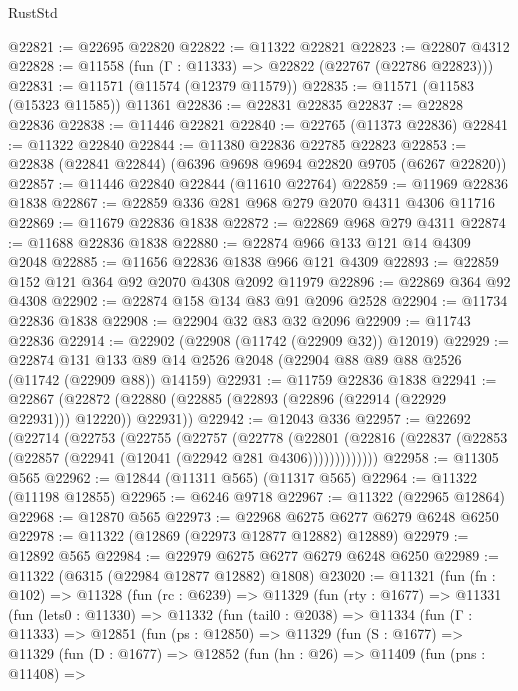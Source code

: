\begin{lexlean}{RustStd}
\begin{coremodule}
@22821 := @22695 @22820
@22822 := @11322 @22821
@22823 := @22807 @4312
@22828 := @11558 (fun (Γ : @11333) => @22822 (@22767 (@22786 @22823)))
@22831 := @11571 (@11574 (@12379 @11579))
@22835 := @11571 (@11583 (@15323 @11585)) @11361
@22836 := @22831 @22835
@22837 := @22828 @22836
@22838 := @11446 @22821
@22840 := @22765 (@11373 @22836)
@22841 := @11322 @22840
@22844 := @11380 @22836 @22785 @22823
@22853 := @22838 (@22841 @22844) (@6396 @9698 @9694 @22820 @9705 (@6267 @22820))
@22857 := @11446 @22840 @22844 (@11610 @22764)
@22859 := @11969 @22836 @1838
@22867 := @22859 @336 @281 @968 @279 @2070 @4311 @4306 @11716
@22869 := @11679 @22836 @1838
@22872 := @22869 @968 @279 @4311
@22874 := @11688 @22836 @1838
@22880 := @22874 @966 @133 @121 @14 @4309 @2048
@22885 := @11656 @22836 @1838 @966 @121 @4309
@22893 := @22859 @152 @121 @364 @92 @2070 @4308 @2092 @11979
@22896 := @22869 @364 @92 @4308
@22902 := @22874 @158 @134 @83 @91 @2096 @2528
@22904 := @11734 @22836 @1838
@22908 := @22904 @32 @83 @32 @2096
@22909 := @11743 @22836
@22914 := @22902 (@22908 (@11742 (@22909 @32)) @12019)
@22929 := @22874
    @131
    @133
    @89
    @14
    @2526
    @2048
    (@22904 @88 @89 @88 @2526 (@11742 (@22909 @88)) @14159)
@22931 := @11759 @22836 @1838
@22941 := @22867 (@22872 (@22880 (@22885 (@22893 (@22896 (@22914 (@22929 @22931))) @12220)) @22931))
@22942 := @12043 @336
@22957 := @22692
    (@22714
      (@22753
        (@22755
          (@22757
            (@22778
              (@22801
                (@22816 (@22837 (@22853 (@22857 (@22941 (@12041 (@22942 @281 @4306)))))))))))))
@22958 := @11305 @565
@22962 := @12844 (@11311 @565) (@11317 @565)
@22964 := @11322 (@11198 @12855)
@22965 := @6246 @9718
@22967 := @11322 (@22965 @12864)
@22968 := @12870 @565
@22973 := @22968 @6275 @6277 @6279 @6248 @6250
@22978 := @11322 (@12869 (@22973 @12877 @12882) @12889)
@22979 := @12892 @565
@22984 := @22979 @6275 @6277 @6279 @6248 @6250
@22989 := @11322 (@6315 (@22984 @12877 @12882) @1808)
@23020 := @11321
    (fun (fn : @102) =>
    @11328
      (fun (rc : @6239) =>
      @11329
        (fun (rty : @1677) =>
        @11331
          (fun (lets0 : @11330) =>
          @11332
            (fun (tail0 : @2038) =>
            @11334
              (fun (Γ : @11333) =>
              @12851
                (fun (ps : @12850) =>
                @11329
                  (fun (S : @1677) =>
                  @11329
                    (fun (D : @1677) =>
                    @12852
                      (fun (hn : @26) =>
                      @11409
                        (fun (pns : @11408) =>

\end{coremodule}
\end{lexlean}
